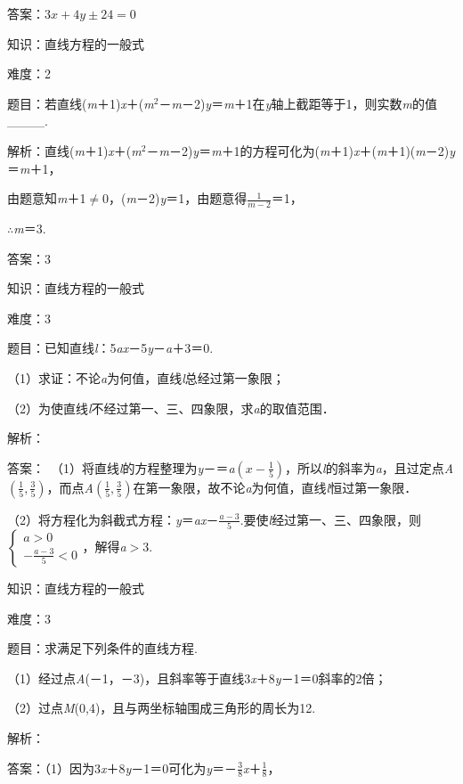 \documentclass{article} %
\begin{document}
答案：$3x+4y\pm 24=0$

知识：直线方程的一般式

难度：2

题目：若直线(\textit{m}＋1)\textit{x}＋(\textit{m}${}^{2}$－\textit{m}－2)\textit{y}＝\textit{m}＋1在\textit{y}轴上截距等于1，则实数\textit{m}的值\_\_\_\_.

解析：直线(\textit{m}＋1)\textit{x}＋(\textit{m}${}^{2}$－\textit{m}－2)\textit{y}＝\textit{m}＋1的方程可化为(\textit{m}＋1)\textit{x}＋(\textit{m}＋1)(\textit{m}－2)\textit{y}＝\textit{m}＋1，

由题意知\textit{m}＋1$\mathrm{\neq}$0，(\textit{m}－2)\textit{y}＝1，由题意得$\frac{1}{m-2}$＝1，

$\mathrm{\therefore}$\textit{m}＝3.

答案：3

知识：直线方程的一般式

难度：3

题目：已知直线\textit{l}：5\textit{ax}－5\textit{y}－\textit{a}＋3＝0.

（1）求证：不论\textit{a}为何值，直线\textit{l}总经过第一象限；

（2）为使直线\textit{l}不经过第一、三、四象限，求\textit{a}的取值范围．

解析：

答案：　（1）将直线\textit{l}的方程整理为\textit{y}－＝\textit{a}$(x-\frac{1}{5})$，所以\textit{l}的斜率为\textit{a}，且过定点\textit{A}$(\frac{1}{5},\frac{3}{5})$，而点\textit{A}$(\frac{1}{5}, \frac{3}{5})$在第一象限，故不论\textit{a}为何值，直线\textit{l}恒过第一象限．

（2）将方程化为斜截式方程：\textit{y}＝\textit{ax}－$\frac{a-3}{5}$.要使\textit{l}经过第一、三、四象限，则$\left\{\begin{array}{l} a>0\\ -\frac{a-3}{5}<0 \end{array}\right.$，解得\textit{a}$\mathrm{>}$3.

知识：直线方程的一般式

难度：3

题目：求满足下列条件的直线方程.

（1）经过点\textit{A}(－1，－3)，且斜率等于直线3\textit{x}＋8\textit{y}－1＝0斜率的2倍；

（2）过点\textit{M}(0,4)，且与两坐标轴围成三角形的周长为12.

解析：

答案：（1）因为3\textit{x}＋8\textit{y}－1＝0可化为\textit{y}＝－$\frac{3}{8}$\textit{x}＋$\frac{1}{8}$，
\end{document}
